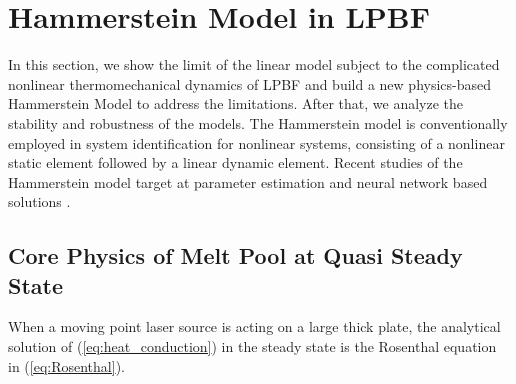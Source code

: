 \documentclass [11pt, proquest] {uwthesis}[2020/02/24]
\begin{document}
\section{\label{sec:HAMMERSTEIN-MODEL-IN}Hammerstein Model in LPBF}

In this section, we show the limit of the linear model subject to
the complicated nonlinear thermomechanical dynamics of LPBF and build
a new physics-based Hammerstein Model to address the limitations.
After that, we analyze the stability and robustness of the models.
The Hammerstein model is conventionally employed in system identification
for nonlinear systems, consisting of a nonlinear static element followed
by a linear dynamic element. Recent studies of the Hammerstein model
target at parameter estimation and neural network based solutions
\cite{rayouf2019new,doyle2002identification,ren2011identification}. 

\subsection{\label{subsec:Analytical-Solutions}Core Physics of Melt Pool at
Quasi Steady State}

When a moving point laser source is acting on a large thick plate,
the analytical solution of (\ref{eq:heat_conduction}) in the steady
state is the Rosenthal equation in (\ref{eq:Rosenthal}).
\end{document}
